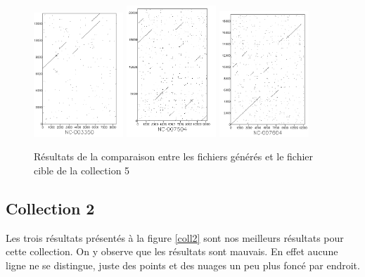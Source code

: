 \documentclass[12pt,a4paper,final]{article}
\begin{document}
\begin{figure}[!ht]
	\centering
	\includegraphics[width=0.3\textwidth]{images/collection5/collection5_1.png}
	\includegraphics[width=0.3\textwidth]{images/collection5/collection5_3.png}
	\includegraphics[width=0.3\textwidth]{images/collection5/collection5_9.png}
	\caption{\label{coll5}Résultats de la comparaison entre les fichiers générés et le fichier cible de la collection 5}
\end{figure}

\subsection{Collection 2}
Les trois résultats présentés à la figure \ref{coll2} sont nos meilleurs résultats pour cette collection. On y observe que les résultats sont mauvais. En effet aucune ligne ne se distingue, juste des points et des nuages un peu plus foncé par endroit.
\end{document}
